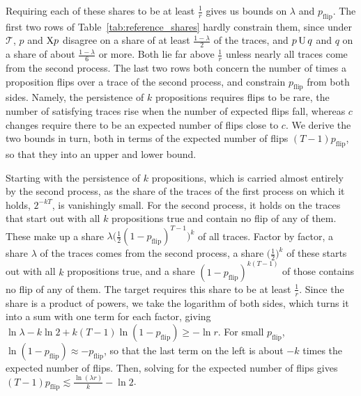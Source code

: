 \documentclass[titlepage,a4paper,11pt]{report}
\begin{document}
    Requiring each of these shares to be at least $\frac1r$ gives us bounds on $\lambda$ and $p_{\text{flip}}$. The first two rows of Table~\ref{tab:reference_shares} hardly constrain them, since under $\mathcal T$, $p$ and $\text{X} p$ disagree on a share of at least $\frac{1-\lambda}{2}$ of the traces, and $p\,\text{U}\,q$ and $q$ on a share of about $\frac{1-\lambda}{6}$ or more. Both lie far above $\frac1r$ unless nearly all traces come from the second process. The last two rows both concern the number of times a proposition flips over a trace of the second process, and constrain $p_{\text{flip}}$ from both sides. Namely, the persistence of $k$ propositions requires flips to be rare, the number of satisfying traces rise when the number of expected flips fall, whereas $c$ changes require there to be an expected number of flips close to $c$. We derive the two bounds in turn, both in terms of the expected number of flips $(T-1)p_{\text{flip}}$, so that they into an upper and lower bound.

    Starting with the persistence of $k$ propositions, which is carried almost entirely by the second process, as the share of the traces of the first process on which it holds, $2^{-kT}$, is vanishingly small. For the second process, it holds on the traces that start out with all $k$ propositions true and contain no flip of any of them. These make up a share $\lambda\bigl(\frac12(1-p_{\text{flip}})^{T-1}\bigr)^k$ of all traces. Factor by factor, a share $\lambda$ of the traces comes from the second process, a share $\bigl(\frac12\bigr)^k$ of these starts out with all $k$ propositions true, and a share $(1-p_{\text{flip}})^{k(T-1)}$ of those contains no flip of any of them. The target requires this share to be at least $\frac1r$. Since the share is a product of powers, we take the logarithm of both sides, which turns it into a sum with one term for each factor, giving $\ln\lambda-k\ln2+k(T-1)\ln(1-p_{\text{flip}})\ge-\ln r$. For small $p_{\text{flip}}$, $\ln(1-p_{\text{flip}})\approx-p_{\text{flip}}$, so that the last term on the left is about $-k$ times the expected number of flips. Then, solving for the expected number of flips gives $(T-1)p_{\text{flip}}\lesssim\frac{\ln(\lambda r)}{k}-\ln2$.
\end{document}

